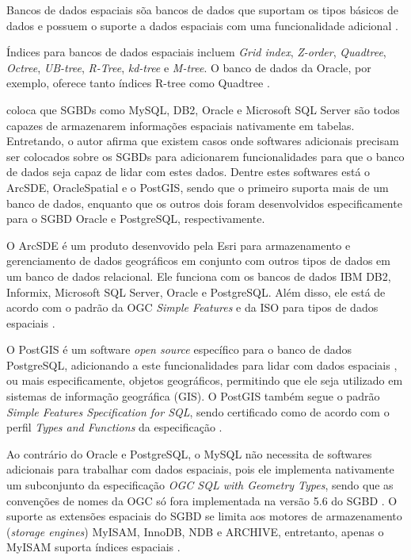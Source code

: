 \documentclass[diss]{template/setrem}
\begin{document}
Bancos de dados espaciais sõa bancos de dados que suportam os tipos básicos de dados e possuem o suporte a dados espaciais com uma funcionalidade adicional \citep{Guting1994}.

Índices para bancos de dados espaciais incluem \emph{Grid index}, \emph{Z-order}, \emph{Quadtree}, \emph{Octree}, \emph{UB-tree}, \emph{R-Tree}, \emph{kd-tree} e \emph{M-tree}. O banco de dados da Oracle, por exemplo, oferece tanto índices R-tree como Quadtree \citep{Velicanu2010}.

\citet{Holdener2011} coloca que SGBDs como MySQL, DB2, Oracle e Microsoft SQL Server são todos capazes de armazenarem informações espaciais nativamente em tabelas. Entretando, o autor afirma que existem casos onde softwares adicionais precisam ser colocados sobre os SGBDs para adicionarem funcionalidades para que o banco de dados seja capaz de lidar com estes dados. Dentre estes softwares está o ArcSDE, OracleSpatial e o PostGIS, sendo que o primeiro suporta mais de um banco de dados, enquanto que os outros dois foram desenvolvidos especificamente para o SGBD Oracle e PostgreSQL, respectivamente.

O ArcSDE é um produto desenvovido pela Esri para armazenamento e gerenciamento de dados geográficos em conjunto com outros tipos de dados em um banco de dados relacional. Ele funciona com os bancos de dados IBM DB2, Informix, Microsoft SQL Server, Oracle e PostgreSQL. Além disso, ele está de acordo com o padrão da OGC \emph{Simple Features} e da ISO para tipos de dados espaciais \citep{Holdener2011}.

O PostGIS é um software \emph{open source} específico para o banco de dados PostgreSQL, adicionando a este funcionalidades para lidar com dados espaciais \citep{Holdener2011}, ou mais especificamente, objetos geográficos, permitindo que ele seja utilizado em sistemas de informação geográfica (GIS). O PostGIS também segue o padrão \emph{Simple Features Specification for SQL}, sendo certificado como de acordo com o perfil \emph{Types and Functions} da especificação \citep{PostGIS2012}.

Ao contrário do Oracle e PostgreSQL, o MySQL não necessita de softwares adicionais para trabalhar com dados espaciais, pois ele implementa nativamente um subconjunto da especificação \emph{OGC SQL with Geometry Types}, sendo que as convenções de nomes da OGC só fora implementada na versão 5.6 do SGBD \citep{Holdener2011}. O suporte as extensões espaciais do SGBD se limita aos motores de armazenamento (\emph{storage engines}) MyISAM, InnoDB, NDB e ARCHIVE, entretanto, apenas o MyISAM suporta índices espaciais \citep{MySQL2012}.
\end{document}
